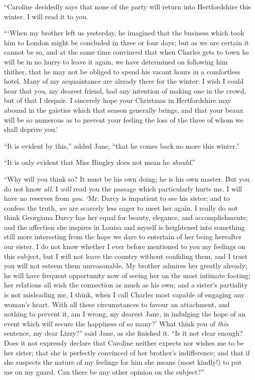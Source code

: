 ``Caroline decidedly says that none of the party will return into Hertfordshire this winter. I will read it to you.

```When my brother left us yesterday, he imagined that the business which took him to London might be concluded in three or four days; but as we are certain it cannot be so, and at the same time convinced that when Charles gets to town he will be in no hurry to leave it again, we have determined on following him thither, that he may not be obliged to spend his vacant hours in a comfortless hotel. Many of my acquaintance are already there for the winter: I wish I could hear that you, my dearest friend, had any intention of making one in the crowd, but of that I despair. I sincerely hope your Christmas in Hertfordshire may abound in the gaieties which that season generally brings, and that your beaux will be so numerous as to prevent your feeling the loss of the three of whom we shall deprive you.'

``It is evident by this,'' added Jane, ``that he comes back no more this winter.''

``It is only evident that Miss Bingley does not mean he \textit{should}.''

``Why will you think so? It must be his own doing; he is his own master. But you do not know \textit{all}. I \textit{will} read you the passage which particularly hurts me. I will have no reserves from \textit{you}. `Mr. Darcy is impatient to see his sister; and to confess the truth, \textit{we} are scarcely less eager to meet her again. I really do not think Georgiana Darcy has her equal for beauty, elegance, and accomplishments; and the affection she inspires in Louisa and myself is heightened into something still more interesting from the hope we dare to entertain of her being hereafter our sister. I do not know whether I ever before mentioned to you my feelings on this subject, but I will not leave the country without confiding them, and I trust you will not esteem them unreasonable. My brother admires her greatly already; he will have frequent opportunity now of seeing her on the most intimate footing; her relations all wish the connection as much as his own; and a sister's partiality is not misleading me, I think, when I call Charles most capable of engaging any woman's heart. With all these circumstances to favour an attachment, and nothing to prevent it, am I wrong, my dearest Jane, in indulging the hope of an event which will secure the happiness of so many?' What think you of \textit{this} sentence, my dear Lizzy?'' said Jane, as she finished it. ``Is it not clear enough? Does it not expressly declare that Caroline neither expects nor wishes me to be her sister; that she is perfectly convinced of her brother's indifference; and that if she suspects the nature of my feelings for him she means (most kindly!) to put me on my guard. Can there be any other opinion on the subject?''


